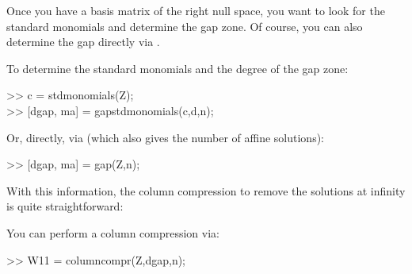 \documentclass{manual}
\begin{document}
            Once you have a basis matrix of the right null space, you want to look for the standard monomials and determine the gap zone. 
            Of course, you can also determine the gap directly via .
            \begin{code}
                To determine the standard monomials and the degree of the gap zone:
                \begin{codeblock}
                    >> c = stdmonomials(Z); \\ 
                    >> {[dgap, ma]} = gapstdmonomials(c,d,n);
                \end{codeblock}
                \noindent Or, directly, via  (which also gives the number of affine solutions):
                \begin{codeblock}
                    >> {[dgap, ma]} = gap(Z,n);
                \end{codeblock}
            \end{code}
            With this information, the column compression to remove the solutions at infinity is quite straightforward:
            \begin{code}
                You can perform a column compression via:
                \begin{codeblock}
                    >> W11 = columncompr(Z,dgap,n);
                \end{codeblock}
            \end{code}
\end{document}
